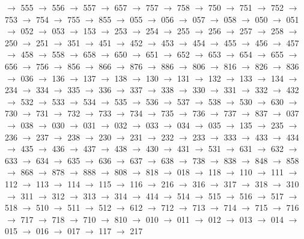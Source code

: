 $\rightarrow$ 555 $\rightarrow$ 556 $\rightarrow$ 557 $\rightarrow$ 657 $\rightarrow$ 757 $\rightarrow$ 758 $\rightarrow$ 750 $\rightarrow$ 751 $\rightarrow$ 752 $\rightarrow$ 753 $\rightarrow$ 754 $\rightarrow$ 755 $\rightarrow$ 855 $\rightarrow$ 055 $\rightarrow$ 056 $\rightarrow$ 057 $\rightarrow$ 058 $\rightarrow$ 050 $\rightarrow$ 051 $\rightarrow$ 052 $\rightarrow$ 053 $\rightarrow$ 153 $\rightarrow$ 253 $\rightarrow$ 254 $\rightarrow$ 255 $\rightarrow$ 256 $\rightarrow$ 257 $\rightarrow$ 258 $\rightarrow$ 250 $\rightarrow$ 251 $\rightarrow$ 351 $\rightarrow$ 451 $\rightarrow$ 452 $\rightarrow$ 453 $\rightarrow$ 454 $\rightarrow$ 455 $\rightarrow$ 456 $\rightarrow$ 457 $\rightarrow$ 458 $\rightarrow$ 558 $\rightarrow$ 658 $\rightarrow$ 650 $\rightarrow$ 651 $\rightarrow$ 652 $\rightarrow$ 653 $\rightarrow$ 654 $\rightarrow$ 655 $\rightarrow$ 656 $\rightarrow$ 756 $\rightarrow$ 856 $\rightarrow$ 866 $\rightarrow$ 876 $\rightarrow$ 886 $\rightarrow$ 806 $\rightarrow$ 816 $\rightarrow$ 826 $\rightarrow$ 836 $\rightarrow$ 036 $\rightarrow$ 136 $\rightarrow$ 137 $\rightarrow$ 138 $\rightarrow$ 130 $\rightarrow$ 131 $\rightarrow$ 132 $\rightarrow$ 133 $\rightarrow$ 134 $\rightarrow$ 234 $\rightarrow$ 334 $\rightarrow$ 335 $\rightarrow$ 336 $\rightarrow$ 337 $\rightarrow$ 338 $\rightarrow$ 330 $\rightarrow$ 331 $\rightarrow$ 332 $\rightarrow$ 432 $\rightarrow$ 532 $\rightarrow$ 533 $\rightarrow$ 534 $\rightarrow$ 535 $\rightarrow$ 536 $\rightarrow$ 537 $\rightarrow$ 538 $\rightarrow$ 530 $\rightarrow$ 630 $\rightarrow$ 730 $\rightarrow$ 731 $\rightarrow$ 732 $\rightarrow$ 733 $\rightarrow$ 734 $\rightarrow$ 735 $\rightarrow$ 736 $\rightarrow$ 737 $\rightarrow$ 837 $\rightarrow$ 037 $\rightarrow$ 038 $\rightarrow$ 030 $\rightarrow$ 031 $\rightarrow$ 032 $\rightarrow$ 033 $\rightarrow$ 034 $\rightarrow$ 035 $\rightarrow$ 135 $\rightarrow$ 235 $\rightarrow$ 236 $\rightarrow$ 237 $\rightarrow$ 238 $\rightarrow$ 230 $\rightarrow$ 231 $\rightarrow$ 232 $\rightarrow$ 233 $\rightarrow$ 333 $\rightarrow$ 433 $\rightarrow$ 434 $\rightarrow$ 435 $\rightarrow$ 436 $\rightarrow$ 437 $\rightarrow$ 438 $\rightarrow$ 430 $\rightarrow$ 431 $\rightarrow$ 531 $\rightarrow$ 631 $\rightarrow$ 632 $\rightarrow$ 633 $\rightarrow$ 634 $\rightarrow$ 635 $\rightarrow$ 636 $\rightarrow$ 637 $\rightarrow$ 638 $\rightarrow$ 738 $\rightarrow$ 838 $\rightarrow$ 848 $\rightarrow$ 858 $\rightarrow$ 868 $\rightarrow$ 878 $\rightarrow$ 888 $\rightarrow$ 808 $\rightarrow$ 818 $\rightarrow$ 018 $\rightarrow$ 118 $\rightarrow$ 110 $\rightarrow$ 111 $\rightarrow$ 112 $\rightarrow$ 113 $\rightarrow$ 114 $\rightarrow$ 115 $\rightarrow$ 116 $\rightarrow$ 216 $\rightarrow$ 316 $\rightarrow$ 317 $\rightarrow$ 318 $\rightarrow$ 310 $\rightarrow$ 311 $\rightarrow$ 312 $\rightarrow$ 313 $\rightarrow$ 314 $\rightarrow$ 414 $\rightarrow$ 514 $\rightarrow$ 515 $\rightarrow$ 516 $\rightarrow$ 517 $\rightarrow$ 518 $\rightarrow$ 510 $\rightarrow$ 511 $\rightarrow$ 512 $\rightarrow$ 612 $\rightarrow$ 712 $\rightarrow$ 713 $\rightarrow$ 714 $\rightarrow$ 715 $\rightarrow$ 716 $\rightarrow$ 717 $\rightarrow$ 718 $\rightarrow$ 710 $\rightarrow$ 810 $\rightarrow$ 010 $\rightarrow$ 011 $\rightarrow$ 012 $\rightarrow$ 013 $\rightarrow$ 014 $\rightarrow$ 015 $\rightarrow$ 016 $\rightarrow$ 017 $\rightarrow$ 117 $\rightarrow$ 217 